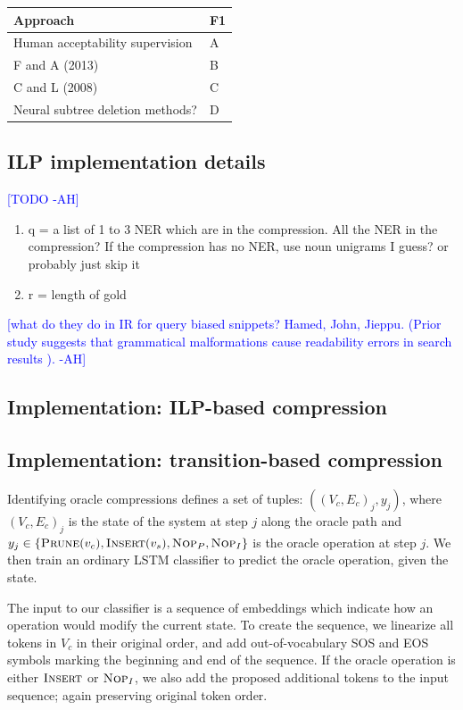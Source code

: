 \documentclass[11pt,a4paper]{article}
\newcommand{\ahcomment}[1]{\textcolor{blue}{[#1 -AH]}}
\begin{document}
\begin{table}[htb!]
\begin{tabular}{ll}
\centering
Approach & F1 \\ \hline
Human acceptability supervision         &  A          \\
F and A (2013)    & B           \\
C and L (2008)    & C        \\
Neural subtree deletion methods? &  D    \\   
\end{tabular}
\end{table}

\subsection{ILP implementation details}
\ahcomment{TODO}


\begin{enumerate}
\item{q = a list of 1 to 3 NER which are in the compression. All the NER in the compression? If the compression has no NER, use noun unigrams I guess? or probably just skip it}
\item{r = length of gold}
\end{enumerate}

\ahcomment{what do they do in IR for query biased snippets? Hamed, John, Jieppu.
 (Prior study suggests that grammatical malformations cause readability errors in search results \cite{kanungo2009predicting}).}

\subsection{Implementation: ILP-based compression}

\subsection{Implementation: transition-based compression}

Identifying oracle compressions defines a set of tuples: ${((V_c,E_c)_j, y_j)}$, where $(V_c,E_c)_j$ is the state of the system at step $j$ along the oracle path and $y_j \in  \{ \textsc{Prune}(v_c), \textsc{Insert}(v_s), \textsc{Nop}_P, \textsc{Nop}_I \}$ is the oracle operation at step $j$. We then train an ordinary LSTM classifier to predict the oracle operation, given the state. 

The input to our classifier is a sequence of embeddings which indicate how an operation would modify the current state. To create the sequence, we linearize all tokens in $V_c$ in their original order, and add out-of-vocabulary SOS and EOS symbols marking the beginning and end of the sequence. If the oracle operation is either $\textsc{Insert}$ or $\textsc{Nop}_I$, we also add the proposed additional tokens to the input sequence; again preserving original token order.
\end{document}
